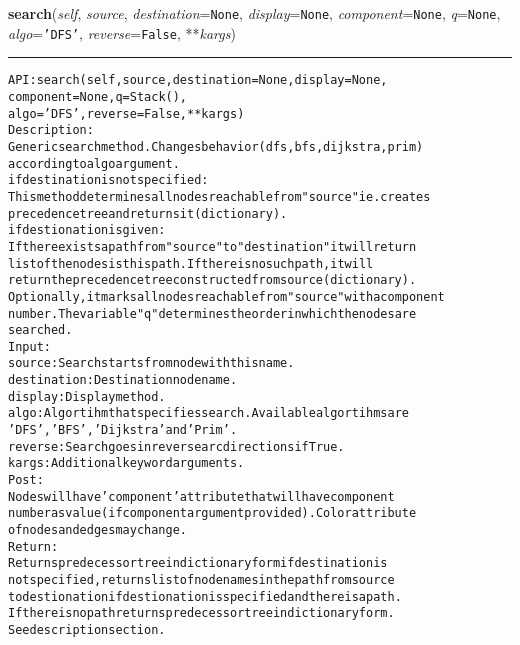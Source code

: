 \hspace{.8\funcindent}\begin{boxedminipage}{\funcwidth}

    \raggedright \textbf{search}(\textit{self}, \textit{source}, \textit{destination}={\tt None}, \textit{display}={\tt None}, \textit{component}={\tt None}, \textit{q}={\tt None}, \textit{algo}={\tt \texttt{'}\texttt{DFS}\texttt{'}}, \textit{reverse}={\tt False}, **\textit{kargs})

    \vspace{-1.5ex}

    \rule{\textwidth}{0.5\fboxrule}
\setlength{\parskip}{2ex}
\begin{alltt}

API: search(self, source, destination = None, display = None,
       component = None, q = Stack(),
       algo = 'DFS', reverse = False, **kargs)
Description:
Generic search method. Changes behavior (dfs,bfs,dijkstra,prim)
according to algo argument.
if destination is not specified:
   This method determines all nodes reachable from "source" ie. creates
   precedence tree and returns it (dictionary).
if destionation is given:
   If there exists a path from "source" to "destination" it will return
   list of the nodes is this path. If there is no such path, it will
   return the precedence tree constructed from source (dictionary).
Optionally, it marks all nodes reachable from "source" with a component
number. The variable "q" determines the order in which the nodes are
searched.
Input:
    source: Search starts from node with this name.
    destination: Destination node name.
    display: Display method.
    algo: Algortihm that specifies search. Available algortihms are
    'DFS', 'BFS', 'Dijkstra' and 'Prim'.
    reverse: Search goes in reverse arc directions if True.
    kargs: Additional keyword arguments.
Post:
    Nodes will have 'component' attribute that will have component
    number as value (if component argument provided). Color attribute
    of nodes and edges may change.
Return:
    Returns predecessor tree in dictionary form if destination is
    not specified, returns list of node names in the path from source
    to destionation if destionation is specified and there is a path.
    If there is no path returns predecessor tree in dictionary form.
    See description section.
\end{alltt}

\setlength{\parskip}{1ex}
    \end{boxedminipage}

